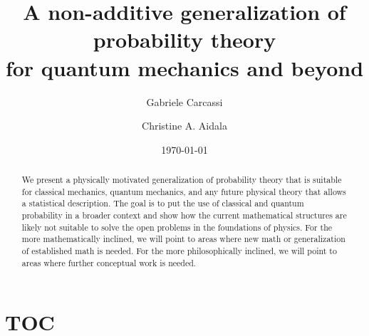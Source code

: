 \documentclass[10pt,twocolumn, nofootinbib]{revtex4-2}
\begin{document}
\title{A non-additive generalization of probability theory \\for quantum mechanics and beyond}
\author{Gabriele Carcassi}
\author{Christine A. Aidala}

\date{\today}


\begin{abstract}
	We present a physically motivated generalization of probability theory that is suitable for classical mechanics, quantum mechanics, and any future physical theory that allows a statistical description. The goal is to put the use of classical and quantum probability in a broader context and show how the current mathematical structures are likely not suitable to solve the open problems in the foundations of physics. For the more mathematically inclined, we will point to areas where new math or generalization of established math is needed. For the more philosophically inclined, we will point to areas where further conceptual work is needed.
	
	
\end{abstract}

\maketitle

\section{TOC}
\end{document}
